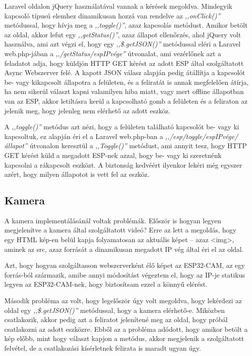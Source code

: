 \documentclass[
]{thesis-ekf}
\theoremstyle{definition}
\theoremstyle{remark}
\begin{document}
	Laravel oldalon jQuery használatával vannak a kérések megoldva. Mindegyik kapcsoló típusú elemhez dinamikusan hozzá van rendelve az \emph{,,onClick()''} metódussal, hogy hívja meg a \emph{,,toggle()''}, azaz kapcsolás metódust. Amikor betölt az oldal, akkor lefut egy \emph{,,getStatus()''}, azaz állapot ellenőrzés, ahol jQuery volt használva, ami azt végzi el, hogy egy \emph{,,\$.getJSON()''} metódussal eléri a Laravel web.php-jában a \emph{,,/getStatus/espIPvége''} útvonalat, ami vezérlőnek azt a feladatot adja, hogy küldjön HTTP GET kérést az adott ESP által szolgáltatott Async Webszerver felé. A kapott JSON válasz alapján pedig átállítja a kapcsolót be- vagy kikapcsolt állapotra a felületen, és a feliratát is annak megfelelően átírja, ha nem sikerül választ kapni valamilyen hiba miatt, vagy mert offline állapotban van az ESP, akkor letiltásra kerül a kapcsolható gomb a felületen és a feliraton az jelenik meg, hogy jelenleg nem elérhető az adott eszköz.
	
	A \emph{,,toggle()''} metódus azt nézi, hogy a felületen található kapcsolót be- vagy ki kapcsoltuk, ez alapján éri el a Laravel web.php-ban a \emph{,,/esp/toggle/espIPvége/állapot''} útvonalon keresztül a \emph{,,Toggle()''} metódust, ami annyit tesz, hogy HTTP GET kérést küld a megadott ESP-nek azzal, hogy be- vagy ki szeretnénk kapcsolni a rákapcsolt eszközt. A biztonság kedvéért ilyenkor lekéri még egyszer azért, hogy milyen állapotot is vett fel az eszköz.
	
	\subsection{Kamera}
	
	A kamera implementálásánál voltak problémák. Először is hogyan legyen megjelenítve a kamera által szolgáltatott videó? Erre az lett a megoldás, hogy egy HTML kép-en belül kapja folyamatosan az aktuális képet -- azaz <img>, aminek az src, azaz forrását a dinamikusan megadott IP vég által éri el az oldal.
	
	Azt, hogy hogyan szolgáltasson webszerverként élő képet az ESP32-CAM, az egy forrás-ból\cite{esp32-cam} származik, amibe annyi módosítást végeztem el, hogy az IP-je statikus legyen az ESP32-CAM-nek, hogy biztosítsam ezzel a könnyű elérést. 
	
	Második probléma az volt, hogy legelőször úgy volt megoldva, hogy lekérdezi az oldal egy \emph{,,\$.getJSON()''} metódussal, hogy a kamera elérhető-e. Miközben csatlakozik, akkor pedig azt a feliratot jelenítené meg az oldal, hogy próbál csatlakozni az adott eszközre. Ebből az a probléma adódott, hogy amikor betölt a kép előbb, mint hogy választ kapjon a metódus, akkor megjelenik a szolgáltatott felvétel, de a csatlakozási kísérletnek felirata is maradt ugyan úgy.
	
\end{document}

